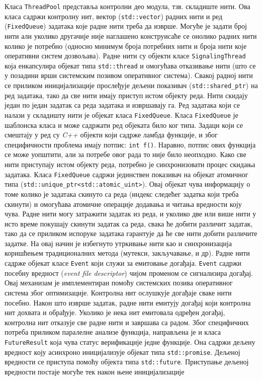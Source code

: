 \documentclass[12pt,oneside]{memoir}
\begin{document}
Класа \texttt{ThreadPool} представља контролни део модула, тзв. складиште нити. Ова класа садржи контролну нит, вектор (\texttt{std::vector}) радних нити и ред (\texttt{FixedQueue}) задатака које радне нити треба да изврше. Могуће је задати број нити али уколико другачије није наглашено конструисаће се онолико радних нити колико је потребно (односно минимум броја потребних нити и броја нити које оперативни систем дозвољава). Радне нити су објекти класе \texttt{SignalingThread} која енкапсулира објекат типа \texttt{std::thread} и омогућава отказивање нити (што се у позадини врши системским позивом оперативног система). Свакој радној нити се приликом иницијализације прослеђује дељени показивач (\texttt{std::shared\_ptr}) на ред задатака, тако да све нити имају приступ истом објекту реда. Нити скидају један по један задатак са реда задатака и извршавају га. Ред задатака који се налази у складишту нити је објекат класа \texttt{FixedQueue}. Класа \texttt{FixedQueue} је шаблонска класа и може садржати ред објеката било ког типа. Задаци који се смештају у ред су \textit{C++} објекти који садрже ламбда функције, и због специфичности проблема имају потпис: \texttt{int f()}. Наравно, потпис ових функција се може уопштити, али за потребе овог рада то није било неопходно. Како све нити приступају истом објекту реда, потребно је синхронизовати процес скидања задатака. Класа \texttt{FixedQueue} садржи јединствен показивач на објекат атомичног типа (\texttt{std::unique\_ptr<std::atomic\_uint>}). Овај објекат чува информацију о томе колико је задатака скинуто са реда (индекс следећег задатка који треба скинути) и омогућава атомичне операције додавања и читања вредности коју чува. Радне нити могу затражити задатак из реда, и уколико две или више нити у исто време покушају скинути задатак са реда, свака ће добити различит задатак, тако да се приликом испоруке задатака гарантује да ће све нити добити различите задатке.  На овај начин је избегнуто утркивање нити као и синхронизација коришћењем традиционалних метода (мутекси, закључавање, и др). Радне нити садрже објекат класе \texttt{Event} који служи за емитовање догађаја. \texttt{Event} садржи посебну вредност (\textit{event file descriptor}) чијом променом се сигнализира догађај. Овај механизам је имплементиран помоћу системских позива оперативног система због  оптимизације. Контролна нит ослушкује догађаје сваке нити посебно. Након што изврше задатак, радне нити емитују догађај који контролна нит дохвата и обрађује. Уколико је нека нит емитовала одређен догађај, контролна нит отказује све радне нити и завршава са радом.
Због специфичних потреба приликом паралелне анализе функција, направљена је и класа \texttt{FutureResult} која чува статус верификације једне функције. Она садржи дељену вредност коју асинхроно иницијализује објекат типа \texttt{std::promise}. Дељеној вредности се приступа помоћу објекта типа \texttt{std::future}. Приступање дељеној вредности постаје могуће тек након њене иницијализације
\end{document}
